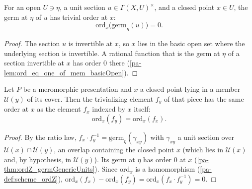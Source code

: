 \begin{theorem}
  \label{pa-thm:ordZ_germGenericUnits}
  \leanok

  For an open \(U \ni \eta\), a unit section \(u \in \Gamma(X,U)^{\times}\), and a closed point
  \(x \in U\), the germ at \(\eta\) of \(u\) has trivial order at \(x\):
  \[
    \mathrm{ord}_x\bigl(\mathrm{germ}_\eta(u)\bigr) = 0.
  \]
\end{theorem}
\begin{proof}
  \leanok
  The section \(u\) is invertible at \(x\), so \(x\) lies in the basic open set where the
  underlying section is invertible. A rational function that is the germ at \(\eta\) of a section
  invertible at \(x\) has order \(0\) there (\ref{pa-lem:ord_eq_one_of_mem_basicOpen}).
\end{proof}

\begin{theorem}
  \label{pa-thm:ordZ_elem_eq}
  \leanok

  Let \(P\) be a meromorphic presentation and \(x\) a closed point lying in a member
  \(\mathcal U(y)\) of its cover. Then the trivializing element \(f_y\) of that piece has the same
  order at \(x\) as the element \(f_x\) indexed by \(x\) itself:
  \[
    \mathrm{ord}_x(f_y) = \mathrm{ord}_x(f_x).
  \]
\end{theorem}
\begin{proof}
  \leanok
  By the ratio law, \(f_x \cdot f_y^{-1} = \mathrm{germ}_\eta(\gamma_{xy})\) with \(\gamma_{xy}\) a
  unit section over \(\mathcal U(x) \cap \mathcal U(y)\), an overlap containing the closed point
  \(x\) (which lies in \(\mathcal U(x)\) and, by hypothesis, in \(\mathcal U(y)\)). Its germ at
  \(\eta\) has order \(0\) at \(x\) (\ref{pa-thm:ordZ_germGenericUnits}). Since \(\mathrm{ord}_x\) is a
  homomorphism (\ref{pa-def:scheme_ordZ}), \(\mathrm{ord}_x(f_x) - \mathrm{ord}_x(f_y) =
  \mathrm{ord}_x(f_x \cdot f_y^{-1}) = 0\).
\end{proof}

